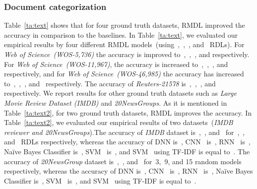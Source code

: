 \documentclass[sigconf, final]{acmart}
\begin{document}
\subsubsection{Document categorization}
Table~\ref{ta:text} shows that for four ground truth datasets, RMDL improved the accuracy in comparison to the baselines. In Table~\ref{ta:text}, we evaluated our empirical results by four different RMDL models~(using~,~,~, and~ RDLs). For \textit{Web of Science~(WOS-5,736)} the accuracy is improved to~,~,~, and  respectively. For  \textit{Web of Science~(WOS-11,967)}, the accuracy is increased to~,~,~, and~ respectively, and for \textit{Web of Science~(WOS-46,985)} the accuracy has increased to~,~,~, and~ respectively. The accuracy of \textit{Reuters-21578} is~,~,~, and~ respectively. We report results for other ground truth datasets such as \textit{Large Movie Review Dataset (IMDB)} and \textit{20NewsGroups}. As it is mentioned in Table~\ref{ta:text2}, for two ground truth datasets, RMDL improves the accuracy. In Table~\ref{ta:text2}, we evaluated our empirical results of two datasets~(\textit{IMDB reviewer and 20NewsGroups}).The accuracy of \textit{IMDB} dataset is~,~, and~ for~,~, and~ RDLs respectively, whereas the accuracy of DNN is~, CNN~\cite{yang2016hierarchical} is~, RNN~\cite{yang2016hierarchical} is~, Na\"{i}ve Bayes Classifier is~, SVM~\cite{zhang2008text} is~, and SVM~\cite{chen2016turning} using TF-IDF is equal to~. The accuracy of \textit{20NewsGroup} dataset is~,~, and~ for~3,~9, and 15 random models respectively, whereas the accuracy of DNN is~, CNN~\cite{yang2016hierarchical} is~, RNN~\cite{yang2016hierarchical} is~, Na\"{i}ve Bayes Classifier is~, SVM~\cite{zhang2008text} is~, and SVM~\cite{chen2016turning} using TF-IDF is equal to~.\\
\end{document}
